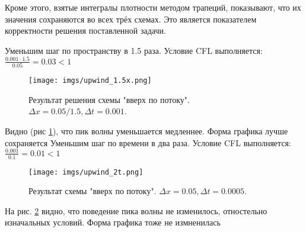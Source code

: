 Кроме этого, взятые интегралы плотности методом трапеций, показывают, что их значения сохраняются во всех трёх схемах. Это является показателем корректности решения поставленной задачи.

\newpage
Уменьшим шаг по пространству в 1.5 раза.  Условие CFL выполняется: $\frac{0.001 \cdot 1.5}{0.05} = 0.03 < 1$

\begin{figure}[h]  %
	\centering
	\texttt{[image: imgs/upwind\_1.5x.png]}  %
	\caption{Результат решения  схемы "вверх по потоку". $\Delta x = 0.05 / 1.5, \Delta t = 0.001$.}  %
	\label{fig:upwind_1.5x}  %
\end{figure}
Видно (рис \ref{fig:upwind_1.5x}), что пик волны уменьшается медленнее. Форма графика лучше сохраняется
\newpage
Уменьшим шаг по времени в два раза.  Условие CFL выполняется: $\frac{0.001}{0.1} = 0.01 < 1$
\begin{figure}[h]  %
	\centering
	\texttt{[image: imgs/upwind\_2t.png]}  %
	\caption{Результат схемы "вверх по потоку". $\Delta x = 0.05 , \Delta t = 0.0005$.}  %
	\label{fig:upwind_2t}  %
\end{figure}

На рис. \ref{fig:upwind_2t} видно, что поведение пика волны не изменилось, отностельно изначальных условий. Форма графика тоже не измненилась








